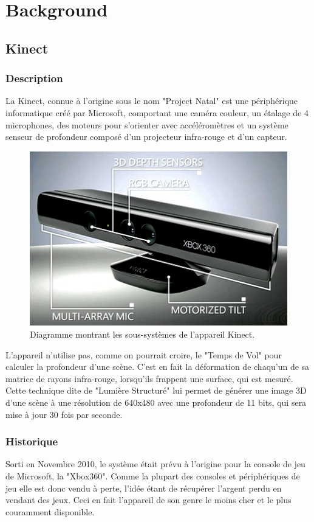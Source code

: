 \documentclass[french,12pt]{report}
\begin{document}

	\chapter{Background}
	
	
		\section{Kinect}

			\subsection{Description}
La Kinect, connue à l'origine sous le nom "Project Natal" est une
périphérique informatique créé par Microsoft, comportant une caméra
couleur, un étalage de 4 microphones, des moteurs pour s'orienter avec 
accéléromètres 
et un système senseur de profondeur composé d'un 
projecteur infra-rouge et d'un capteur. 
  \begin{figure}[h!]
  \centering
  \includegraphics[width=0.8\linewidth]{images/kinect_diagram}
  \caption{Diagramme montrant les sous-systèmes de l'appareil Kinect.}
  \end{figure}
L'appareil n'utilise pas, comme on pourrait croire, le "Temps de Vol" pour
calculer la profondeur d'une scène. C'est en fait la déformation de chaqu'un de 
sa matrice de rayons infra-rouge,
lorsqu'ils frappent une surface, qui est mesuré. Cette technique dite de 
"Lumière Structuré"
lui permet de générer une image 3D d'une scène à une résolution de 640x480 avec 
une profondeur de 11 bits, qui sera mise à jour 30 fois par seconde.

			\subsection{Historique}
Sorti en Novembre 2010, le système était prévu à l'origine pour la console
de jeu de Microsoft, la "Xbox360". Comme la plupart des consoles et
périphériques de jeu elle
est donc vendu à perte, l'idée étant de récupérer l'argent perdu en vendant
des jeux. Ceci en fait l'appareil de son genre le moins cher et le plus couramment
disponible.
\end{document}
